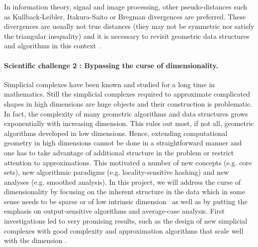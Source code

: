 In information theory, signal and image processing, other pseudo-distances such as Kullback-Leibler, Itakura-Saito or Bregman divergences are preferred.  
These divergences are usually not true distances (they may not be symmetric nor satisfy the triangular inequality) and it is necessary to revisit geometric data structures and algorithms in this context~\cite{geometrica-6154a}.




\paragraph{Scientific challenge 2 :  Bypassing the curse of dimensionality.} 
Simplicial complexes have been known and studied for a long time in mathematics.  
Still the simplicial complexes required to approximate complicated shapes in high dimensions are huge objects and their construction is problematic. In fact, 
the complexity of many geometric algorithms and data structures grows exponentially with increasing dimension. %
This rules out most, if not all, geometric algorithms developed in low dimensions.  Hence, extending computational geometry in high dimensions cannot be done in a straightforward manner and one has to take advantage of additional structure in the problem or  restrict attention to approximations. This motivated a number of new concepts (e.g. core sets), new algorithmic paradigms (e.g. locality-sensitive hashing) and new analyses (e.g. smoothed analysis).  In this project, we will address the curse of dimensionality by focusing on the inherent structure in the data which in some sense needs to be sparse or of low intrinsic dimension~\cite{sl-mwp-2000} as well as by putting the emphasis on output-sensitive algorithms and average-case analysis.  
First investigations led to very promising results, such as the design of new simplicial complexes with good complexity and approximation algorithms that scale well with the dimension \cite{geometrica-7142i,cds-tewc-2004}.


